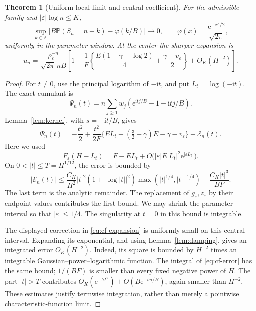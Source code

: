 \documentclass[11pt,a4paper]{article}
\numberwithin{equation}{section}
\newtheorem{theorem}{Theorem}[section]
\theoremstyle{definition}
\theoremstyle{remark}
\newcommand{\eps}{\varepsilon}
\newcommand{\Pp}{\mathbb P}
\newcommand{\ee}{\mathrm e}
\newcommand{\ii}{\mathrm i}
\newcommand{\ph}{\varphi}
\newcommand{\FF}{F_{\eps}}
\begin{document}
\begin{theorem}[Uniform local limit and central coefficient]
\label{thm:coefficient}
For the admissible family and \(|\eps|\log n\le K\),
\begin{equation}
 \sup_{k\in\mathbb Z}
 \left|B\Pp(S_n=n+k)-\ph(k/B)\right|\longrightarrow0,
 \qquad \ph(x)=\frac{\ee^{-x^2/2}}{\sqrt{2\pi}},
 \label{eq:uniform-llt}
\end{equation}
uniformly in the parameter window. At the center the sharper expansion is
\begin{equation}
 u_n=\frac{\rho_{\eps}^{-n}}{\sqrt{2\pi}\,nB}
 \left[1-\frac1F\left\{
 \frac{E(1-\gamma+\log2)}4+\frac{\gamma+v_{\eps}}2
 \right\}+O_K(H^{-2})\right].
 \label{eq:coefficient-main}
\end{equation}
\end{theorem}
\begin{proof}
For \(t\ne0\), use the principal logarithm of \(-\ii t\), and put
\(L_t=\log(-\ii t)\). The exact cumulant is
\[
 \Psi_n(t)=n\sum_{j\ge1}w_j
 (\ee^{\ii tj/B}-1-\ii tj/B).
\]
Lemma~\ref{lem:kernel}, with \(s=-\ii t/B\), gives
\begin{equation}
 \Psi_n(t)=-\frac{t^2}{2}
 +\frac{t^2}{2F}
 \{EL_t-(\tfrac32-\gamma)E-\gamma-v_{\eps}\}
 +\mathcal E_n(t).
 \label{eq:cf-expansion}
\end{equation}
Here we used
\[
 \FF(H-L_t)=F-EL_t+
 O\bigl(|\eps|E|L_t|^2\ee^{|\eps L_t|}\bigr).
\]
On \(0<|t|\le T=H^{1/12}\), the error is bounded by
\begin{equation}
 |\mathcal E_n(t)|\le
 \frac{C_K}{H^2}|t|^2(1+|\log|t||^2)
 \max(|t|^{1/4},|t|^{-1/4})
 +\frac{C_K|t|^3}{BF}.
 \label{eq:cf-error}
\end{equation}
The last term is the analytic remainder. The replacement of
\(g_{\eps},z_{\eps}\) by their endpoint values contributes the first bound.
We may shrink the parameter interval so that \(|\eps|\le1/4\).
The singularity at \(t=0\) in this bound is integrable.

The displayed correction in \eqref{eq:cf-expansion} is uniformly small on
this central interval. Expanding its exponential, and using
Lemma~\ref{lem:damping}, gives an integrated error \(O_K(H^{-2})\).
Indeed, its square is bounded by \(H^{-2}\) times an integrable
Gaussian--power--logarithmic function. The integral of
\eqref{eq:cf-error} has the same bound; \(1/(BF)\) is smaller than every
fixed negative power of \(H\). The part \(|t|>T\) contributes
\(O_K(\ee^{-bT^2})+O(B\ee^{-bn/B})\), again smaller than \(H^{-2}\).
These estimates justify termwise integration, rather than merely a
pointwise characteristic-function limit.


\end{proof}
\end{document}
